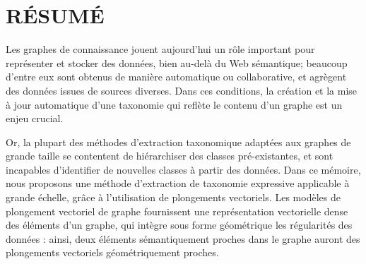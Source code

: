 %
\chapter*{RÉSUMÉ}\thispagestyle{headings}







Les graphes de connaissance jouent aujourd'hui un rôle important pour représenter et stocker des données, bien au-delà du Web sémantique;
beaucoup d'entre eux sont obtenus de manière automatique ou collaborative, et agrègent des données issues de sources diverses. Dans ces conditions, la création et la mise à jour automatique d'une taxonomie qui reflète le contenu d'un graphe est un enjeu crucial.


Or, la plupart des méthodes d'extraction taxonomique adaptées aux graphes de grande taille se contentent de hiérarchiser des classes pré-existantes, et sont incapables d'identifier de nouvelles classes à partir des données. Dans ce mémoire, nous proposons une méthode d'extraction de taxonomie expressive applicable à grande échelle, grâce à l'utilisation de plongements vectoriels. Les modèles de plongement vectoriel de graphe fournissent une représentation vectorielle dense des éléments d'un graphe, qui intègre sous forme géométrique les régularités des données : ainsi, deux éléments sémantiquement proches dans le graphe auront des plongements vectoriels géométriquement proches.


